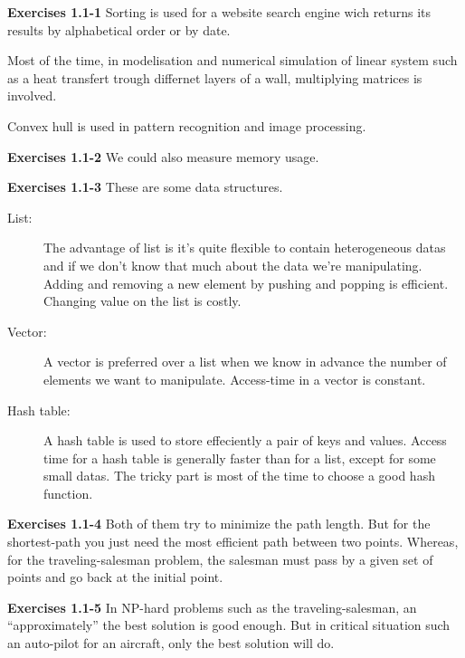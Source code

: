 \documentclass[a4paper,12pt]{article}
\newcommand{\newpar}[1]{\bigskip \noindent \textbf{Exercises #1} \newline}
\begin{document}
\newpar{1.1-1}
Sorting is used for a website search engine wich returns its results
by alphabetical order or by date.

\medskip
Most of the time, in modelisation and numerical simulation of linear
system such as a heat transfert trough differnet layers of a wall,
multiplying matrices is involved.

\medskip
Convex hull is used in pattern recognition and image processing.

\newpar{1.1-2}
We could also measure memory usage.

\newpar{1.1-3} These are some data structures.
\begin{description}
\item[List:]
The advantage of list is it's quite flexible to contain heterogeneous
datas and if we don't know that much about the data we're
manipulating.  Adding and removing a new element by pushing and
popping is efficient.  Changing value on the list is costly.

\item[Vector:]
A vector is preferred over a list when we know in advance the number
of elements we want to manipulate.  Access-time in a vector is
constant.

\item[Hash table:]
A hash table is used to store effeciently a pair of keys and values.
Access time for a hash table is generally faster than for a list,
except for some small datas.  The tricky part is most of the time to
choose a good hash function.
\end{description}

\newpar{1.1-4}
Both of them try to minimize the path length.  But for the
shortest-path you just need the most efficient path between two
points.  Whereas, for the traveling-salesman problem,  the salesman
must pass by a given set of points and go back at the initial point.

\newpar{1.1-5}
In NP-hard problems such as the traveling-salesman,  an
``approximately'' the best solution is good enough.  But in critical
situation such an auto-pilot for an aircraft, only the best solution
will do.
\end{document}
